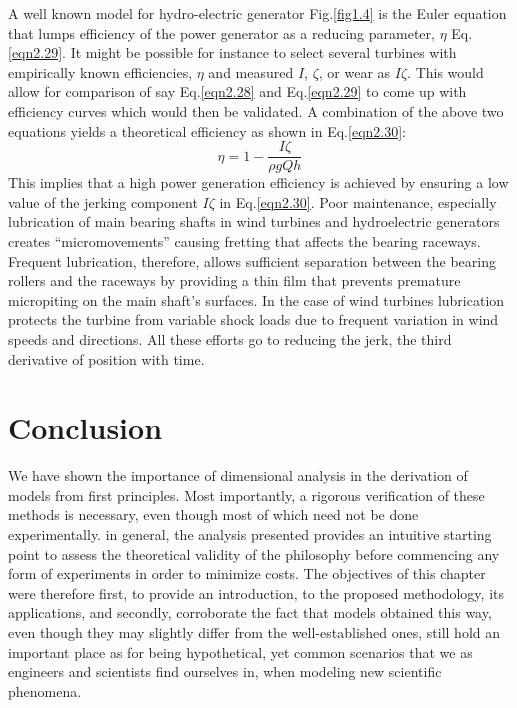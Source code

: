 \noindent A well known model for hydro-electric generator Fig.\ref{fig1.4} is the Euler equation that lumps efficiency of the power generator as a reducing parameter, $\eta$ Eq.\eqref{eqn2.29}. It might be possible for instance to select several turbines with empirically known efficiencies, $\eta$  and measured $I$, $\zeta$, or wear as $I\zeta$. This would allow for comparison of say Eq.\eqref{eqn2.28} and Eq.\eqref{eqn2.29} to come up with efficiency curves which would then be validated. A combination of the above two equations yields a theoretical efficiency as shown in Eq.\eqref{eqn2.30}:
\begin{equation}
\eta = 1 - \frac{I\zeta}{\rho g Q h}
\label{eqn2.30}
\end{equation}
\noindent This implies that a high power generation efficiency is achieved by ensuring a low value of the jerking component $I\zeta$ in Eq.\eqref{eqn2.30}. Poor maintenance, especially lubrication of main bearing shafts in wind turbines and hydroelectric generators creates ``micromovements'' causing fretting that affects the bearing raceways. Frequent lubrication, therefore, allows sufficient separation between the bearing rollers and the raceways by providing a thin film that prevents premature micropiting on the main shaft's surfaces. In the case of wind turbines lubrication protects the turbine from variable shock loads due to frequent variation in wind speeds and directions. All these efforts go to reducing the jerk, the third derivative of position with time.
\section{Conclusion}
\noindent We have shown the importance of dimensional analysis in the derivation of models from first principles. Most importantly, a rigorous verification of these methods is necessary, even though most of which need not be done experimentally. in general, the analysis presented provides an intuitive starting point to assess the theoretical validity of the philosophy before commencing any form of experiments in order to minimize costs. The objectives of this chapter were therefore first, to provide an introduction, to the proposed methodology, its applications, and secondly, corroborate the fact that models obtained this way, even though they may slightly differ from the well-established ones, still hold an important place as for being hypothetical, yet common scenarios that we as engineers and scientists find ourselves in, when modeling new scientific phenomena.
    
